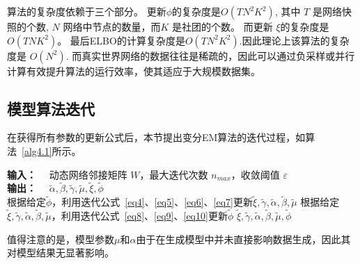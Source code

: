 
算法的复杂度依赖于三个部分。 更新$\phi$的复杂度是$O(TN^2K^2)$, 其中 $T$ 是网络快照的个数,  $N$ 网络中节点的数量，而$K$ 是社团的个数。 而更新 $\xi$的复杂度是$O(TNK^2)$。 最后ELBO的计算复杂度是$O(TN^2K^2)$.因此理论上该算法的复杂度是 $O(N^2)$. 而真实世界网络的数据往往是稀疏的，因此可以通过负采样或并行计算有效提升算法的运行效率，使其适应于大规模数据集。



\subsection{模型算法迭代}

在获得所有参数的更新公式后，本节提出变分EM算法的迭代过程，如算法~\ref{alg4.1}所示。

\begin{algorithm}
	\caption{HB-DSBM迭代算法}\label{alg4.1}
	\begin{algorithmic}[1]
		\STATE \textbf{输入：}~~ 动态网络邻接矩阵 $W$，最大迭代次数 $n_{max}$，收敛阈值 $\varepsilon$ \\
		\STATE \textbf{输出：}~~ $\widetilde{\alpha}, \widetilde{\beta}, \widetilde{\gamma}, \widetilde{\mu}, \widetilde{\xi}, \widetilde{\phi}$ \\
		\REPEAT
		\STATE 根据给定$\widetilde{\phi}$，利用迭代公式~\ref{eq4}、\ref{eq5}、\ref{eq6}、\ref{eq7}更新$\widetilde{\xi}, \widetilde{\gamma}, \widetilde{\alpha}, \widetilde{\beta}, \widetilde{\mu}$
		\STATE 根据给定$\widetilde{\xi}, \widetilde{\gamma}, \widetilde{\alpha}, \widetilde{\beta}, \widetilde{\mu}$，利用迭代公式~\ref{eq8}、\ref{eq9}、\ref{eq10}更新$\widetilde{\phi}$
		\RETURN $\widetilde{\xi}, \widetilde{\gamma}, \widetilde{\alpha}, \widetilde{\beta}, \widetilde{\mu}, \widetilde{\phi}$
	\end{algorithmic}
\end{algorithm}
值得注意的是，模型参数$\mu$和$\alpha$由于在生成模型中并未直接影响数据生成，因此其对模型结果无显著影响。

